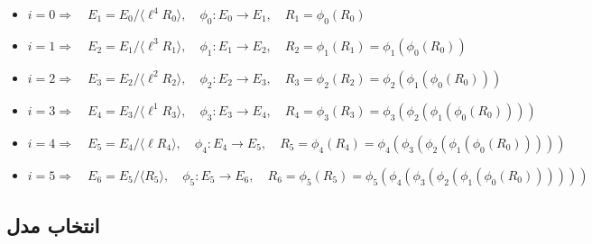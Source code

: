 \begin{itemize}
	
	\item[] {}
	\begin{flushleft}
		$
		i=0 \Rightarrow \quad 
		E_1 = E_0 / \langle \ell^{4}R_0 \rangle , \quad 
		\phi_0 : E_0 \rightarrow E_1 , \quad 
		R_1 = \phi_0(R_0)
		$
	\end{flushleft}
	
	\item[] {}
	\begin{flushleft}
		$
		i=1 \Rightarrow \quad 
		E_2 = E_1 / \langle \ell^{3}R_1 \rangle , \quad 
		\phi_1 : E_1 \rightarrow E_2 , \quad 	R_2 = \phi_1(R_1) = \phi_1(\phi_0(R_0))
		$
	\end{flushleft}
	
	\item[] {}
	\begin{flushleft}
		$
		i=2 \Rightarrow \quad 
		E_3 = E_2 / \langle \ell^{2}R_2 \rangle , \quad 
		\phi_2 : E_2 \rightarrow E_3 , \quad 	R_3 = \phi_2(R_2) = \phi_2(\phi_1(\phi_0(R_0)))
		$
	\end{flushleft}
	
	\item[] {}
	\begin{flushleft}
		$
		i=3 \Rightarrow \quad 
		E_4 = E_3 / \langle \ell^{1}R_3 \rangle , \quad 
		\phi_3 : E_3 \rightarrow E_4 , \quad 	R_4 = \phi_3(R_3) = \phi_3(\phi_2(\phi_1(\phi_0(R_0))))
		$
	\end{flushleft}
	
	\item[] {}
	\begin{flushleft}
		$
		i=4 \Rightarrow \quad 
		E_5 = E_4 / \langle \ell R_4 \rangle , \quad 
		\phi_4 : E_4 \rightarrow E_5 , \quad 	R_5 = \phi_4(R_4) = 
		\phi_4(\phi_3(\phi_2(\phi_1(\phi_0(R_0)))))
		$
	\end{flushleft}
	
	\item[] {}
	\begin{flushleft}
		$
		i=5 \Rightarrow \quad 
		E_6 = E_5 / \langle R_5 \rangle , \quad 
		\phi_5 : E_5 \rightarrow E_6 , \quad 	R_6 = \phi_5(R_5) = 
		\phi_5(\phi_4(\phi_3(\phi_2(\phi_1(\phi_0(R_0))))))
		$
	\end{flushleft}
	
\end{itemize}


\subsection{\bf انتخاب مدل}\label{model_choice}





